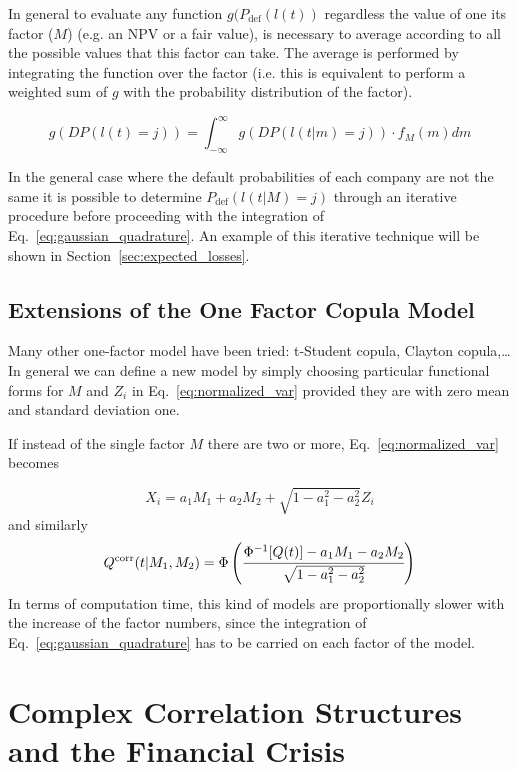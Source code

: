 In general to evaluate any function $g(P_{\mathrm{def}}(l(t))$ regardless the value of one its factor ($M$) (e.g. an NPV or a fair value), is necessary to average according to all the possible values that this factor can take. The average is performed by integrating the function over the factor (i.e. this is equivalent to perform a weighted sum of $g$ with the probability distribution of the factor).  

\begin{equation}
g(DP(l(t) = j)) = \int_{-\infty}^{\infty}{g(DP(l(t|m) = j))\cdot f_M(m)dm}
\label{eq:gaussian_quadrature}
\end{equation}

In the general case where the default probabilities of each company are not the same it is possible to determine $P_{\mathrm{def}}(l(t|M)=j)$ through an iterative procedure before proceeding with the integration of Eq.~\ref{eq:gaussian_quadrature}. An example of this iterative technique will be shown in Section~\ref{sec:expected_losses}.

\subsection{Extensions of the One Factor Copula Model}
Many other one-factor model have been tried: t-Student copula, Clayton copula,\ldots In general we can define a new model by simply choosing particular functional forms for $M$ and $Z_i$ in Eq.~\ref{eq:normalized_var} provided they are with zero mean and standard deviation one. 

If instead of the single factor $M$ there are two or more, Eq.~\ref{eq:normalized_var} becomes

\begin{equation}
X_i = a_1 M_1 + a_2 M_2 + \sqrt{1 - a_1^2 - a^2_2}Z_i
\end{equation}
and similarly
\begin{equation}
Q^{\textrm{corr}}(t|M_1, M_2) = \Phi\left(\cfrac{\Phi^{-1}[Q(t)]-a_1 M_1 - a_2 M_2}{\sqrt{1 - a_1^2 - a^2_2}}\right)
\end{equation}
In terms of computation time, this kind of models are proportionally slower with the increase of the factor numbers, since the integration of Eq.~\ref{eq:gaussian_quadrature} has to be carried on each factor of the model.

\section{Complex Correlation Structures and the Financial Crisis}
\label{complex-correlation-structures-and-the-financial-crisis}


